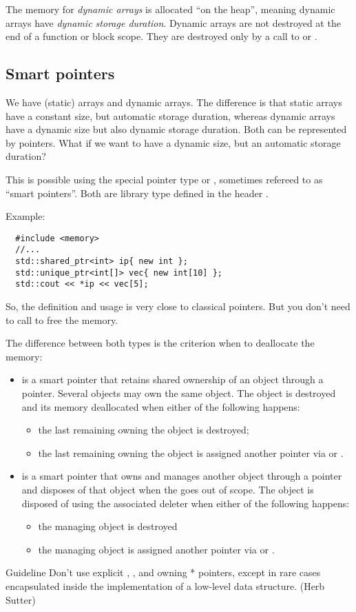 The memory for \emph{dynamic arrays} is allocated ``on the heap'', meaning dynamic arrays have \emph{dynamic storage duration}. Dynamic arrays are not destroyed at
the end of a function or block scope. They are destroyed only by a call to  or .


\subsection{Smart pointers}
We have (static) arrays and dynamic arrays. The difference is that static arrays have a constant size, but automatic storage duration, whereas dynamic arrays
have a dynamic size but also dynamic storage duration. Both can be represented by pointers. What if we want to have a dynamic size, but an automatic
storage duration?

This is possible using the special pointer type  or , sometimes refereed to as ``smart pointers''. Both are library
type defined in the header .

Example:
\begin{verbatim}
  #include <memory>
  //...
  std::shared_ptr<int> ip{ new int };
  std::unique_ptr<int[]> vec{ new int[10] };
  std::cout << *ip << vec[5];
\end{verbatim}
%
So, the definition and usage is very close to classical pointers. But you don't need to call  to free the memory.

The difference between both types is the criterion when to deallocate the memory:
\begin{itemize}
  \item {} is a smart pointer that retains shared ownership of an object through a pointer. Several  objects may own the
  same object. The object is destroyed and its memory deallocated when either of the following happens:
  \begin{itemize}
    \item the last remaining  owning the object is destroyed;
    \item the last remaining  owning the object is assigned another pointer via  or .
  \end{itemize}

  \item {} is a smart pointer that owns and manages another object through a pointer and disposes of that object when the
   goes out of scope. The object is disposed of using the associated deleter when either of the following happens:
  \begin{itemize}
    \item the managing  object is destroyed
    \item the managing  object is assigned another pointer via  or .
  \end{itemize}
\end{itemize}

\begin{guideline}{Guideline}
  Don’t use explicit , , and owning * pointers, except in rare cases encapsulated inside the implementation of a low-level data structure. (Herb Sutter)
\end{guideline}
